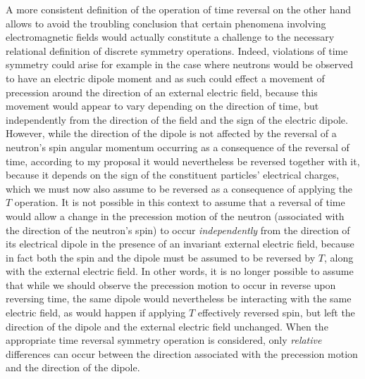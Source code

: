 \documentclass[notitlepage,12pt]{report}
\begin{document}
A more consistent definition of the operation of time reversal on the other hand allows to avoid the troubling conclusion that certain phenomena involving electromagnetic fields would actually constitute a challenge to the necessary relational definition of discrete symmetry operations. Indeed, violations of time symmetry could arise for example in the case where neutrons would be observed to have an electric dipole moment and as such could effect a movement of precession around the direction of an external electric field, because this movement would appear to vary depending on the direction of time, but independently from the direction of the field and the sign of the electric dipole. However, while the direction of the dipole is not affected by the reversal of a neutron's spin angular momentum occurring as a consequence of the reversal of time, according to my proposal it would nevertheless be reversed together with it, because it depends on the sign of the constituent particles' electrical charges, which we must now also assume to be reversed as a consequence of applying the $T$ operation. It is not possible in this context to assume that a reversal of time would allow a change in the precession motion of the neutron (associated with the direction of the neutron's spin) to occur \textit{independently} from the direction of its electrical dipole in the presence of an invariant external electric field, because in fact both the spin and the dipole must be assumed to be reversed by $T$, along with the external electric field. In other words, it is no longer possible to assume that while we should observe the precession motion to occur in reverse upon reversing time, the same dipole would nevertheless be interacting with the same electric field, as would happen if applying $T$ effectively reversed spin, but left the direction of the dipole and the external electric field unchanged. When the appropriate time reversal symmetry operation is considered, only \textit{relative} differences can occur between the direction associated with the precession motion and the direction of the dipole.
\end{document}
